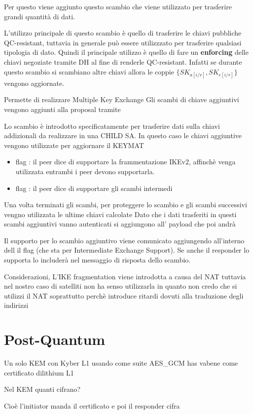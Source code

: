 Per questo viene aggiunto questo scambio che viene utilizzato per trasferire grandi quantità di dati.

L'utilizzo principale di questo scambio è quello di trasferire le chiavi pubbliche QC-resistant, tuttavia in generale può essere utilizzzato per trasferire qualsiasi tipologia di dato.
Quindi il principale utilizzo è quello di fare un \textbf{enforcing} delle chiavi negoziate tramite DH al fine di renderle QC-resistant. Infatti se durante questo scambio si scambiano 
altre chiavi allora le coppie $\{SK_{a[i/r]}, SK_{e[i/r]}\}$ vengono aggiornate.

Permette di realizzare Multiple Key Exchange
Gli scambi di chiave aggiuntivi vengono aggiunti alla proposal tramite 



Lo scambio  è introdotto specificatamente per trasferire dati sulla chiavi addizionali da realizzare in una CHILD SA.
In questo caso le chiavi aggiuntive vengono utilizzate per aggiornare il KEYMAT



\begin{itemize}
    \item flag : il peer dice di supportare la frammentazione IKEv2, affinchè venga utilizzata entrambi i peer devono supportarla.
    \item flag : il peer dice di supportare gli scambi intermedi
\end{itemize}

Una volta terminati gli scambi, per proteggere lo scambio  e gli scambi successivi vengno utilizzata le ultime chiavi calcolate
Dato che i dati trasferiti in questi scambi aggiuntivi vanno autenticati si aggiungono all' payload che poi andrà 



Il supporto per lo scambio aggiuntivo viene comunicato aggiungendo all'interno
dell  il flag  (che sta per
Intermediate Exchange Support).
Se anche il responder lo supporta lo includerà nel messaggio di risposta dello
scambio.




Considerazioni, L'IKE fragmentation viene introdotta a causa del NAT tuttavia nel nostro caso di satelliti non ha senso utilizzarla in quanto non credo che si utilizzi
il NAT soprattutto perchè introduce ritardi dovuti alla traduzione degli indirizzi



\section{Post-Quantum}

Un solo KEM con Kyber L1 usando come suite AES\_GCM has vabene come certificato dilithium L1

Nel KEM quanti cifrano?

Cioè l'initiator manda il certificato e poi il responder cifra 